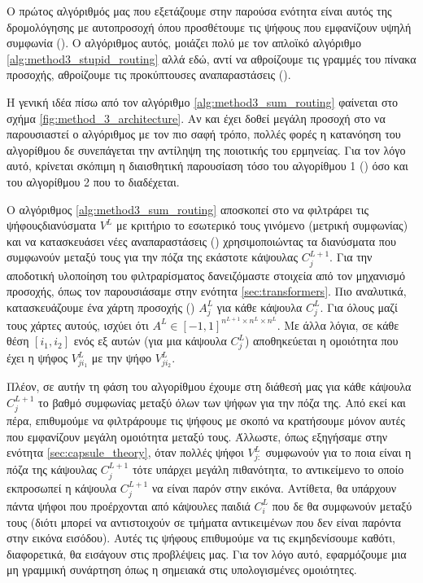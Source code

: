 Ο πρώτος αλγόριθμός μας που εξετάζουμε στην παρούσα ενότητα είναι αυτός της δρομολόγησης με αυτο\textendash προσοχή όπου προσθέτουμε τις ψήφους που εμφανίζουν υψηλή συμφωνία (). Ο αλγόριθμος αυτός, μοιάζει πολύ με τον απλοϊκό αλγόριθμο \ref{alg:method3_stupid_routing} αλλά εδώ, αντί να αθροίζουμε τις γραμμές του πίνακα προσοχής, αθροίζουμε τις προκύπτουσες αναπαραστάσεις (). \par

Η γενική ιδέα πίσω από τον αλγόριθμο \ref{alg:method3_sum_routing} φαίνεται στο σχήμα \ref{fig:method_3_architecture}. Αν και έχει δοθεί μεγάλη προσοχή στο να παρουσιαστεί ο αλγόριθμος με τον πιο σαφή τρόπο, πολλές φορές η κατανόηση του αλγορίθμου δε συνεπάγεται την αντίληψη της ποιοτικής του ερμηνείας. Για τον λόγο αυτό, κρίνεται σκόπιμη η διαισθητική παρουσίαση τόσο του αλγορίθμου 1 () όσο και του αλγορίθμου 2 που το διαδέχεται. \par

Ο αλγόριθμος \ref{alg:method3_sum_routing} αποσκοπεί στο να φιλτράρει τις ψήφους\textendash διανύσματα $V^L$ με κριτήριο το εσωτερικό τους γινόμενο (μετρική συμφωνίας) και να κατασκευάσει νέες αναπαραστάσεις () χρησιμοποιώντας τα διανύσματα που συμφωνούν μεταξύ τους για την πόζα της εκάστοτε κάψουλας $C_j^{L+1}$. Για την αποδοτική υλοποίηση του φιλτραρίσματος δανειζόμαστε στοιχεία από τον μηχανισμό προσοχής, όπως τον παρουσιάσαμε στην ενότητα \ref{sec:transformers}. Πιο αναλυτικά, κατασκευάζουμε ένα χάρτη προσοχής () $A_j^L$ για κάθε κάψουλα $C_j^L$. Για όλους μαζί τους χάρτες αυτούς, ισχύει ότι $A^L \in [-1,1]^{n^{L+1} \times n^L \times n^L}$. Με άλλα λόγια, σε κάθε θέση $[i_1,i_2]$ ενός εξ αυτών (για μια κάψουλα $C_j^L$) αποθηκεύεται η ομοιότητα που έχει η ψήφος $V^L_{ji_1}$ με την ψήφο $V_{ji_2}^L$.\par

Πλέον, σε αυτήν τη φάση του αλγορίθμου έχουμε στη διάθεσή μας για κάθε κάψουλα $C_j^{L+1}$ το βαθμό συμφωνίας μεταξύ όλων των ψήφων για την πόζα της. Από εκεί και πέρα, επιθυμούμε να φιλτράρουμε τις ψήφους με σκοπό να κρατήσουμε μόνον αυτές που εμφανίζουν μεγάλη ομοιότητα μεταξύ τους. Άλλωστε, όπως εξηγήσαμε στην ενότητα \ref{sec:capsule_theory}, όταν πολλές ψήφοι $V_{j:}^L$ συμφωνούν για το ποια είναι η πόζα της κάψουλας $C_j^{L+1}$ τότε υπάρχει μεγάλη πιθανότητα, το αντικείμενο το οποίο εκπροσωπεί η κάψουλα $C_j^{L+1}$ να είναι παρόν στην εικόνα. Αντίθετα, θα υπάρχουν πάντα ψήφοι που προέρχονται από κάψουλες παιδιά $C_i^L$ που δε θα συμφωνούν μεταξύ τους (διότι μπορεί να αντιστοιχούν σε τμήματα αντικειμένων που δεν είναι παρόντα στην εικόνα εισόδου). Αυτές τις ψήφους επιθυμούμε να τις εκμηδενίσουμε καθότι, διαφορετικά, θα εισάγουν  στις προβλέψεις μας. Για τον λόγο αυτό, εφαρμόζουμε μια μη γραμμική συνάρτηση όπως η  σημειακά στις υπολογισμένες ομοιότητες. \par

